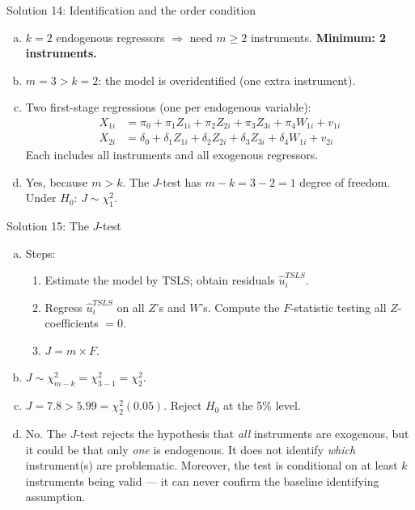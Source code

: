 \documentclass[10pt]{beamer}
\begin{document}
\begin{frame}{Solution 14: Identification and the order condition}
\label{s14}
\begin{enumerate}[(a)]
  \item $k = 2$ endogenous regressors $\Rightarrow$ need $m \geq 2$ instruments. \textbf{Minimum: 2 instruments.}

  \item $m = 3 > k = 2$: the model is \alert{overidentified} (one extra instrument).

  \item Two first-stage regressions (one per endogenous variable):
  \begin{align*}
  X_{1i} &= \pi_0 + \pi_1 Z_{1i} + \pi_2 Z_{2i} + \pi_3 Z_{3i} + \pi_4 W_{1i} + v_{1i} \\
  X_{2i} &= \delta_0 + \delta_1 Z_{1i} + \delta_2 Z_{2i} + \delta_3 Z_{3i} + \delta_4 W_{1i} + v_{2i}
  \end{align*}
  Each includes \alert{all} instruments and \alert{all} exogenous regressors.

  \item Yes, because $m > k$. The $J$-test has $m - k = 3 - 2 = \boxed{1}$ degree of freedom. Under $H_0$: $J \sim \chi^2_1$.
\end{enumerate}

\vfill
\hfill\hyperlink{q14}{}
\end{frame}

\begin{frame}{Solution 15: The $J$-test}
\label{s15}
\begin{enumerate}[(a)]
  \item Steps:
  \begin{enumerate}[1.]
    \item Estimate the model by TSLS; obtain residuals $\widehat{u}_i^{TSLS}$.
    \item Regress $\widehat{u}_i^{TSLS}$ on all $Z$'s and $W$'s. Compute the $F$-statistic testing all $Z$-coefficients $= 0$.
    \item $J = m \times F$.
  \end{enumerate}

  \item $J \sim \chi^2_{m-k} = \chi^2_{3-1} = \chi^2_2$.

  \item $J = 7.8 > 5.99 = \chi^2_2(0.05)$. \alert{Reject $H_0$} at the 5\% level.

  \item No. The $J$-test rejects the hypothesis that \emph{all} instruments are exogenous, but it could be that only \emph{one} is endogenous. It does not identify \emph{which} instrument(s) are problematic. Moreover, the test is conditional on at least $k$ instruments being valid --- it can never confirm the baseline identifying assumption.
\end{enumerate}

\vfill
\hfill\hyperlink{q15}{}
\end{frame}
\end{document}
